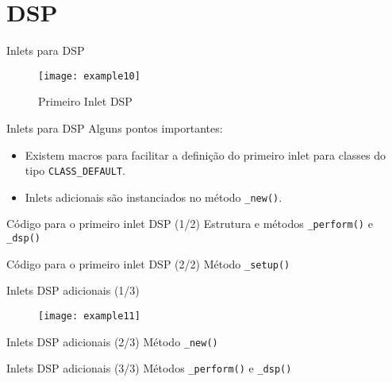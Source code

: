 \section{DSP}


\begin{frame}{Inlets para DSP}
\begin{figure}[h!]
\centering
\texttt{[image: example10]}
\caption{Primeiro Inlet DSP}
\end{figure}
\end{frame}


\begin{frame}{Inlets para DSP}
Alguns pontos importantes:
\begin{itemize}
\item Existem macros para facilitar a definição do primeiro inlet para classes
do tipo \texttt{CLASS\_DEFAULT}.
\item Inlets adicionais são instanciados no método \texttt{\_new()}.
\end{itemize}
\end{frame}


\begin{frame}{Código para o primeiro inlet DSP (1/2)}
{Estrutura e métodos \texttt{\_perform()} e \texttt{\_dsp()}}

\end{frame}


\begin{frame}{Código para o primeiro inlet DSP (2/2)}
{Método \texttt{\_setup()}}

\end{frame}


\begin{frame}{Inlets DSP adicionais (1/3)}
\begin{figure}[h!]
\centering
\texttt{[image: example11]}
\end{figure}
\end{frame}


\begin{frame}{Inlets DSP adicionais (2/3)}
{Método \texttt{\_new()}}

\end{frame}


\begin{frame}{Inlets DSP adicionais (3/3)}
{Métodos \texttt{\_perform()} e \texttt{\_dsp()}}

\end{frame}


